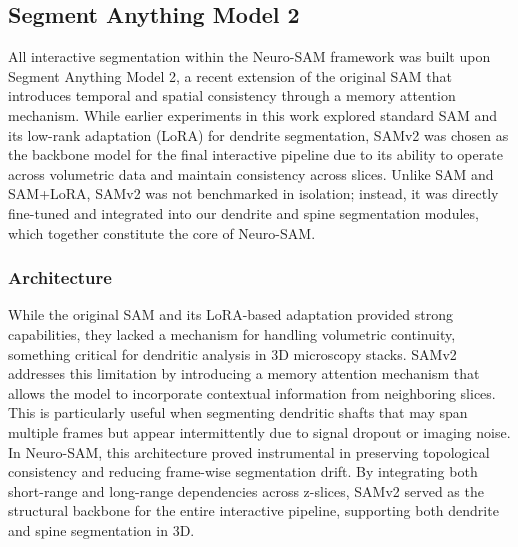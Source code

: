 
\subsection{Segment Anything Model 2}
All interactive segmentation within the Neuro-\gls{SAM} framework was built upon Segment Anything Model 2, a recent extension of the original \gls{SAM} that introduces temporal and spatial consistency through a memory attention mechanism. While earlier experiments in this work explored standard \gls{SAM} and its low-rank adaptation (\gls{LoRA}) for dendrite segmentation, \gls{SAMv2} was chosen as the backbone model for the final interactive pipeline due to its ability to operate across volumetric data and maintain consistency across slices. Unlike \gls{SAM} and \gls{SAM}+\gls{LoRA}, \gls{SAMv2} was not benchmarked in isolation; instead, it was directly fine-tuned and integrated into our dendrite and spine segmentation modules, which together constitute the core of Neuro-\gls{SAM}.

\subsubsection{\textbf{Architecture}}
While the original \gls{SAM} and its \gls{LoRA}-based adaptation provided strong capabilities, they lacked a mechanism for handling volumetric continuity, something critical for dendritic analysis in 3D microscopy stacks. \gls{SAMv2} addresses this limitation by introducing a memory attention mechanism that allows the model to incorporate contextual information from neighboring slices. This is particularly useful when segmenting dendritic shafts that may span multiple frames but appear intermittently due to signal dropout or imaging noise. In Neuro-\gls{SAM}, this architecture proved instrumental in preserving topological consistency and reducing frame-wise segmentation drift. By integrating both short-range and long-range dependencies across z-slices, \gls{SAMv2} served as the structural backbone for the entire interactive pipeline, supporting both dendrite and spine segmentation in 3D.

